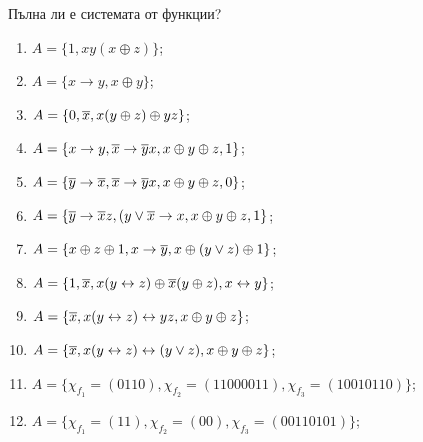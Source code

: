 \begin{problem} %
  Пълна ли е системата от функции?
  \begin{enumerate}[1)]
  \item
    $A = \{1, xy(x\oplus z)\}$;
  \item
    $A = \{x\rightarrow y, x\oplus y\}$;
  \item
    $A = \{0, \overline{x}, x(y\oplus z)\oplus yz\}$;
  \item
    $A = \{x\rightarrow y, \overline{x}\rightarrow \overline{y}x, x\oplus y\oplus z, 1\}$;
  \item
    $A = \{\overline{y}\rightarrow\overline{x}, \overline{x}\rightarrow \overline{y}x, x\oplus y\oplus z, 0\}$;
  \item
    $A = \{\overline{y}\rightarrow \overline{x}z, (y\vee \overline{x} \rightarrow x, x\oplus y\oplus z, 1\}$;
  \item
    $A = \{x\oplus z \oplus 1, x \to \overline{y}, x\oplus (y \vee z) \oplus 1\}$;
  \item
    $A = \{1,\overline{x}, x(y\leftrightarrow z)\oplus\overline{x}(y\oplus z), x\leftrightarrow y\}$;
  \item
    $A = \{\overline{x}, x(y\leftrightarrow z) \leftrightarrow yz, x \oplus y \oplus z\}$;
  \item
    $A = \{\overline{x}, x(y\leftrightarrow z) \leftrightarrow (y\vee z), x \oplus y \oplus z\}$;
  \item
    $A = \{\chi_{f_1} = (0110), \chi_{f_2} = (1100 0011), \chi_{f_3} = (1001 0110)\}$;
  \item
    $A = \{\chi_{f_1} = (11), \chi_{f_2} = (00), \chi_{f_3} = (0011 0101)\}$;
  \end{enumerate}
\end{problem}
